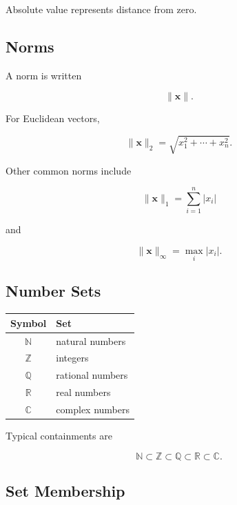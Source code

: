 Absolute value represents distance from zero.

\subsection{Norms}
\label{subsec:norm-notation-reference}

A norm is written

\[
\boxed{
\|\mathbf{x}\|.
}
\]

For Euclidean vectors,

\[
\boxed{
\|\mathbf{x}\|_2
=
\sqrt{
x_1^2+\cdots+x_n^2
}.
}
\]

Other common norms include

\[
\boxed{
\|\mathbf{x}\|_1
=
\sum_{i=1}^{n}|x_i|
}
\]

and

\[
\boxed{
\|\mathbf{x}\|_\infty
=
\max_i|x_i|.
}
\]

\subsection{Number Sets}
\label{subsec:number-set-symbols}

\begin{center}
\begin{tabular}{c|l}
\textbf{Symbol} & \textbf{Set} \\ \hline
\( \mathbb{N} \) & natural numbers \\
\( \mathbb{Z} \) & integers \\
\( \mathbb{Q} \) & rational numbers \\
\( \mathbb{R} \) & real numbers \\
\( \mathbb{C} \) & complex numbers
\end{tabular}
\end{center}

Typical containments are

\[
\boxed{
\mathbb{N}
\subset
\mathbb{Z}
\subset
\mathbb{Q}
\subset
\mathbb{R}
\subset
\mathbb{C}.
}
\]

\subsection{Set Membership}
\label{subsec:set-membership-symbols}

